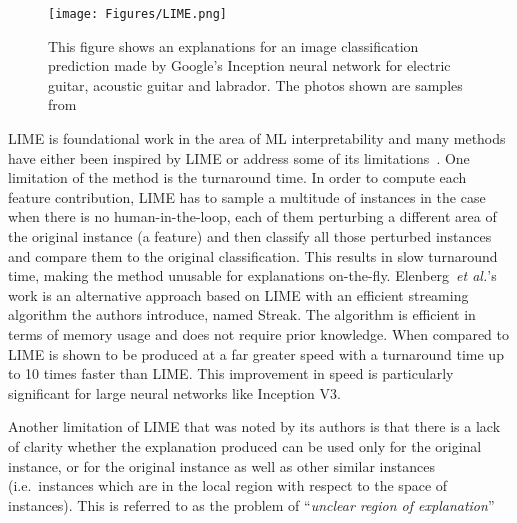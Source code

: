 \begin{figure}[ht!]
	\begin{center}
		\texttt{[image: Figures/LIME.png]}
	\end{center}
	\caption{This figure shows an explanations for an image classification prediction made by Google’s Inception neural network for electric guitar, acoustic guitar and labrador. The photos shown are samples from~\cite{Ribeiro0G16}}
	\label{Fig:VAE}
\end{figure} 


LIME is foundational work in the area of ML interpretability and many methods have either been inspired by LIME or address some of its limitations~\cite{ElenbergDFK17, Ribeiro0G18}. One limitation of the method is the turnaround time. In order to compute each feature contribution, LIME has to sample a multitude of instances in the case when there is no human-in-the-loop, each of them perturbing a different area of the original instance (a feature) and then classify all those perturbed instances and compare them to the original classification. This results in slow turnaround time, making the method unusable for explanations on-the-fly. Elenberg~\textit{et al.}'s~\cite{ElenbergDFK17} work is an alternative approach based on LIME with an efficient streaming algorithm the authors introduce, named Streak. The algorithm is efficient in terms of memory usage and does not require prior knowledge. When compared to LIME is shown to be produced at a far greater speed with a turnaround time up to 10 times faster than LIME. This improvement in speed is particularly significant for large neural networks like Inception V3.


Another limitation of LIME that was noted by its authors is that there is a lack of clarity whether the explanation produced can be used only for the original instance, or for the original instance as well as other similar instances (i.e.\ instances which are in the local region with respect to the space of instances). This is referred to as the problem of ``\emph{unclear region of explanation}''

